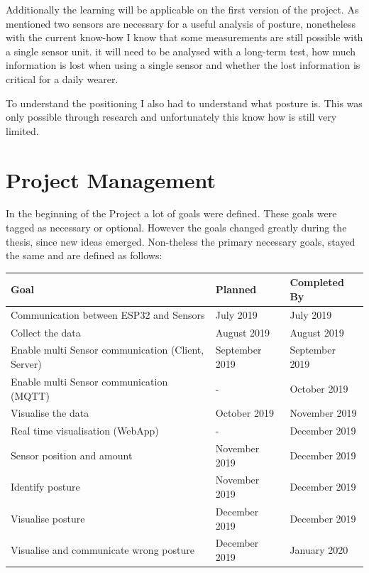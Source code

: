 Additionally the learning will be applicable on the first version of the project. As mentioned two sensors are necessary for a useful analysis of posture, nonetheless with the current know-how I know that some measurements are still possible with a single sensor unit. it will need to be analysed with a long-term test, how much information is lost when using a single sensor and whether the lost information is critical for a daily wearer.

To understand the positioning I also had to understand what posture is. This was only possible through research and unfortunately this know how is still very limited.

\section{Project Management}

In the beginning of the Project a lot of goals were defined. These goals were tagged as necessary or optional. However the goals changed greatly during the thesis, since new ideas emerged. Non-theless the primary necessary goals, stayed the same and are defined as follows: 

\begin{center}

\begin{tabular}{|p{9cm}|p{3cm}|p{3cm}|}
  \hline
 \textbf{Goal} &\textbf{ Planned  } &\textbf{ Completed By } \\ 
  \hline
 Communication between ESP32 and Sensors & July 2019 & July 2019   \\  
 \hline
 Collect the data  & August 2019  & August 2019   \\  
  \hline
 Enable multi Sensor communication (Client, Server) & September 2019 & September 2019   \\ 
  \hline
 Enable multi Sensor communication (MQTT) & - & October 2019   \\ 
  \hline
 Visualise the data & October 2019 & November 2019   \\  
  \hline
 Real time visualisation (WebApp) & - & December 2019   \\  
   \hline
 Sensor position and amount & November 2019 & December 2019   \\ 
  \hline
 Identify posture & November 2019 & December 2019   \\  
  \hline
 Visualise posture & December 2019 &  December 2019 \\    
   \hline
 Visualise and communicate wrong posture & December 2019& January 2020 \\    
  \hline
\end{tabular}
    
\end{center}

